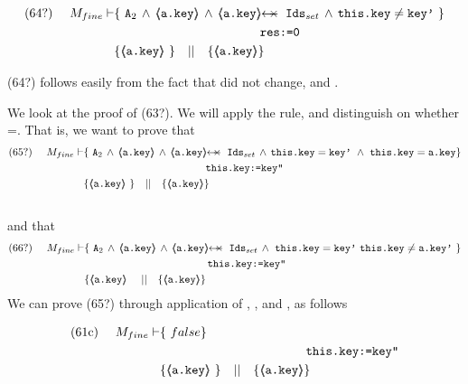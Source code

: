 \begin{proofO}
\begin{align*}
\text{(64?)}  \ \ \ \ M_{fine} \vdash 
		&	\{  \ \Alocalssets\,\wedge\, {\inside{\prg{a.key}}} \, \wedge \, \protectedFrom {\prg{a.key}} {\Idsset} \, \wedge  \,  \prg{this.key}\neq\prg{key'}\  \} \\
		& \SPT\SPT   \SPT\SPT  \prg{res:=0} \\
		& \{ {\inside{\prg{a.key}}}\   \} \ \ \  || \ \ \ 
		   \{ {\inside{\prg{a.key}}} \}
\end{align*}

(64?) follows easily from  the fact that  did not change, and  {}.

\vspace{.5cm}
We look at the proof of (63?).  We will apply the {} rule, and distinguish on whether =. That is, we want to prove that\\
\small{
\begin{align*}
\text{(65?)}  \ \ \ \ M_{fine} \vdash 
		&	\{  \ \Alocalssets\,\wedge\, {\inside{\prg{a.key}}} \, \wedge \, \protectedFrom {\prg{a.key}} {\Idsset} \, \wedge  \,  \prg{this.key}=\prg{key'}\ \wedge\ \prg{this.key}=\prg{a.key}  \} \\
			& \SPT \SPT   \SPT\SPT  \prg{this.key:=key''} \\
	       	& \{ {\inside{\prg{a.key}}}\   \} \ \ \  || \ \ \ 
		   \{ {\inside{\prg{a.key}}} \}
\end{align*}
}
\\
and that
\\
\small{
\begin{align*}
\text{(66?)}  \ \ \ \ M_{fine} \vdash 
		&	\{  \ \Alocalssets\,\wedge\, {\inside{\prg{a.key}}} \, \wedge \, \protectedFrom {\prg{a.key}} {\Idsset} \, \wedge  \,   \,  \prg{this.key}=\prg{key'}\   \prg{this.key}\neq\prg{a.key'}\  \} \\
		& \SPT \SPT   \SPT\SPT  \prg{this.key:=key''} \\
		& \{ {\inside{\prg{a.key}}}\   \ \ \  || \ \ \ 
		   \{ {\inside{\prg{a.key}}} \}
\end{align*}
}
\vspace{.2cm}
\normalsize
We can prove (65?) through application of {}, {}, and {}, as follows

\begin{align*}
\text{(61c)}  \ \ \ \ M_{fine} \vdash 
		&	\{  \ false  \} \\
		& \SPT \SPT   \SPT\SPT  \prg{this.key:=key''} \\
		& \{ {\inside{\prg{a.key}}}\   \} \ \ \  || \ \ \ 
		   \{ {\inside{\prg{a.key}}} \}
\end{align*}


\end{proofO}
